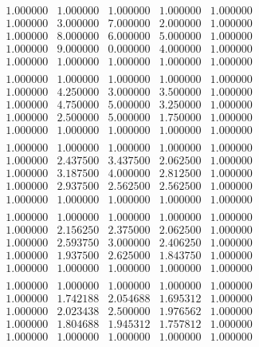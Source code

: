 \documentclass[12pt]{article}
\begin{document}
\hspace{-0.2cm}\begin{minipage}{.5\textwidth}
$$
\begin{matrix}
1.000000 & 1.000000 & 1.000000 & 1.000000 & 1.000000 \\
1.000000 & 3.000000 & 7.000000 & 2.000000 & 1.000000 \\
1.000000 & 8.000000 & 6.000000 & 5.000000 & 1.000000 \\
1.000000 & 9.000000 & 0.000000 & 4.000000 & 1.000000 \\
1.000000 & 1.000000 & 1.000000 & 1.000000 & 1.000000 \\
\end{matrix}
$$
$$
\begin{matrix}
1.000000 & 1.000000 & 1.000000 & 1.000000 & 1.000000 \\
1.000000 & 4.250000 & 3.000000 & 3.500000 & 1.000000 \\
1.000000 & 4.750000 & 5.000000 & 3.250000 & 1.000000 \\
1.000000 & 2.500000 & 5.000000 & 1.750000 & 1.000000 \\
1.000000 & 1.000000 & 1.000000 & 1.000000 & 1.000000 \\
\end{matrix}
$$
$$
\begin{matrix}
1.000000 & 1.000000 & 1.000000 & 1.000000 & 1.000000 \\ 
1.000000 & 2.437500 & 3.437500 & 2.062500 & 1.000000 \\ 
1.000000 & 3.187500 & 4.000000 & 2.812500 & 1.000000 \\ 
1.000000 & 2.937500 & 2.562500 & 2.562500 & 1.000000 \\ 
1.000000 & 1.000000 & 1.000000 & 1.000000 & 1.000000 \\ 
\end{matrix}
$$
$$
\begin{matrix}
1.000000 & 1.000000 & 1.000000 & 1.000000 & 1.000000 \\ 
1.000000 & 2.156250 & 2.375000 & 2.062500 & 1.000000 \\ 
1.000000 & 2.593750 & 3.000000 & 2.406250 & 1.000000 \\ 
1.000000 & 1.937500 & 2.625000 & 1.843750 & 1.000000 \\ 
1.000000 & 1.000000 & 1.000000 & 1.000000 & 1.000000 \\ 
\end{matrix}
$$
$$
\begin{matrix}
1.000000 & 1.000000 & 1.000000 & 1.000000 & 1.000000 \\ 
1.000000 & 1.742188 & 2.054688 & 1.695312 & 1.000000 \\ 
1.000000 & 2.023438 & 2.500000 & 1.976562 & 1.000000 \\ 
1.000000 & 1.804688 & 1.945312 & 1.757812 & 1.000000 \\ 
1.000000 & 1.000000 & 1.000000 & 1.000000 & 1.000000 \\
\end{matrix}
$$
\end{minipage}\hspace{1.5cm}
\end{document}
